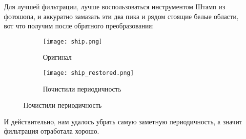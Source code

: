 Для лучшей фильтрации, лучше воспользоваться инструментом Штамп из фотошопа, и аккуратно замазать эти два пика и рядом стоящие белые области,
 вот что получим после обратного преобразования:

\begin{figure}[ht]
	\centering
\hspace*{\fill}%
	\begin{subfigure}[b]{0.49\textwidth}
        \centering
		\texttt{[image: ship.png]}
		\caption{Оригинал}
	\end{subfigure}
\hfill
	\begin{subfigure}[b]{0.49\textwidth}
        \centering
		\texttt{[image: ship\_restored.png]}
        \caption{Почистили периодичность}
	\end{subfigure}
\hspace*{\fill}%
\end{figure}

И действительно, нам удалось убрать самую заметную периодичность, а значит фильтрация отработала хорошо.

\endinput